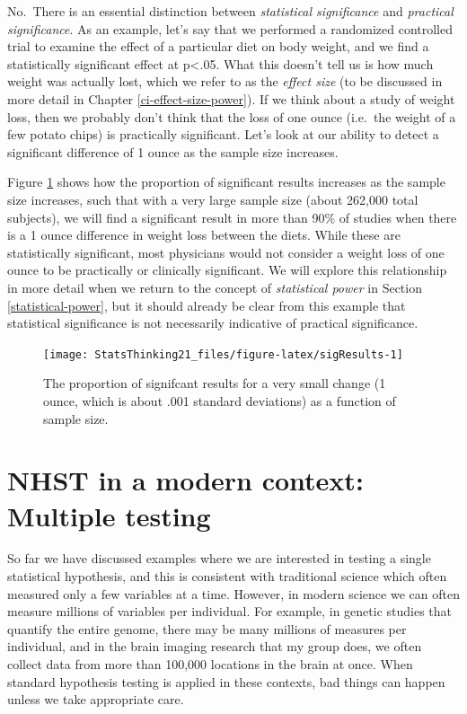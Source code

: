 \documentclass[12pt,]{book}
\theoremstyle{definition}
\theoremstyle{definition}
\theoremstyle{definition}
\theoremstyle{remark}
\begin{document}
No.~There is an essential distinction between \emph{statistical significance} and \emph{practical significance}. As an example, let's say that we performed a randomized controlled trial to examine the effect of a particular diet on body weight, and we find a statistically significant effect at p\textless{}.05. What this doesn't tell us is how much weight was actually lost, which we refer to as the \emph{effect size} (to be discussed in more detail in Chapter \ref{ci-effect-size-power}). If we think about a study of weight loss, then we probably don't think that the loss of one ounce (i.e.~the weight of a few potato chips) is practically significant. Let's look at our ability to detect a significant difference of 1 ounce as the sample size increases.

Figure \ref{fig:sigResults} shows how the proportion of significant results increases as the sample size increases, such that with a very large sample size (about 262,000 total subjects), we will find a significant result in more than 90\% of studies when there is a 1 ounce difference in weight loss between the diets. While these are statistically significant, most physicians would not consider a weight loss of one ounce to be practically or clinically significant. We will explore this relationship in more detail when we return to the concept of \emph{statistical power} in Section \ref{statistical-power}, but it should already be clear from this example that statistical significance is not necessarily indicative of practical significance.

\begin{figure}
\texttt{[image: StatsThinking21\_files/figure-latex/sigResults-1]} \caption{The proportion of signifcant results for a very small change (1 ounce, which is about .001 standard deviations) as a function of sample size.}\label{fig:sigResults}
\end{figure}

\hypertarget{nhst-in-a-modern-context-multiple-testing}{%
\section{NHST in a modern context: Multiple testing}\label{nhst-in-a-modern-context-multiple-testing}}

So far we have discussed examples where we are interested in testing a single statistical hypothesis, and this is consistent with traditional science which often measured only a few variables at a time. However, in modern science we can often measure millions of variables per individual. For example, in genetic studies that quantify the entire genome, there may be many millions of measures per individual, and in the brain imaging research that my group does, we often collect data from more than 100,000 locations in the brain at once. When standard hypothesis testing is applied in these contexts, bad things can happen unless we take appropriate care.
\end{document}
